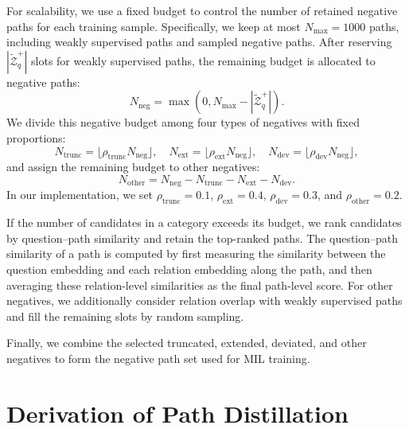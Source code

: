 \documentclass{article}
\begin{document}
For scalability, we use a fixed budget to control the number of retained negative paths for each training sample.
Specifically, we keep at most $N_{\max}=1000$ paths, including weakly supervised paths and sampled negative paths.
After reserving $|\widetilde{\mathcal{Z}}_q^{+}|$ slots for weakly supervised paths, the remaining budget is allocated to negative paths:
\[
N_{\mathrm{neg}}=\max(0, N_{\max}-|\widetilde{\mathcal{Z}}_q^{+}|).
\]
We divide this negative budget among four types of negatives with fixed proportions:
\[
N_{\mathrm{trunc}}=\lfloor \rho_{\mathrm{trunc}}N_{\mathrm{neg}}\rfloor,\quad
N_{\mathrm{ext}}=\lfloor \rho_{\mathrm{ext}}N_{\mathrm{neg}}\rfloor,\quad
N_{\mathrm{dev}}=\lfloor \rho_{\mathrm{dev}}N_{\mathrm{neg}}\rfloor,
\]
and assign the remaining budget to other negatives:
\[
N_{\mathrm{other}}
=
N_{\mathrm{neg}}
-
N_{\mathrm{trunc}}
-
N_{\mathrm{ext}}
-
N_{\mathrm{dev}}.
\]
In our implementation, we set
$\rho_{\mathrm{trunc}}=0.1$,
$\rho_{\mathrm{ext}}=0.4$,
$\rho_{\mathrm{dev}}=0.3$,
and $\rho_{\mathrm{other}}=0.2$.


If the number of candidates in a category exceeds its budget, we rank candidates by question--path similarity and retain the top-ranked paths. The question--path similarity of a path is computed by first measuring the similarity between the question embedding and each relation embedding along the path, and then averaging these relation-level similarities as the final path-level score.
For other negatives, we additionally consider relation overlap with weakly supervised paths and fill the remaining slots by random sampling.

Finally, we combine the selected truncated, extended, deviated, and other negatives to form the negative path set used for MIL training.



\section{Derivation of Path Distillation}
\label{app:distill_derivation}
\end{document}
